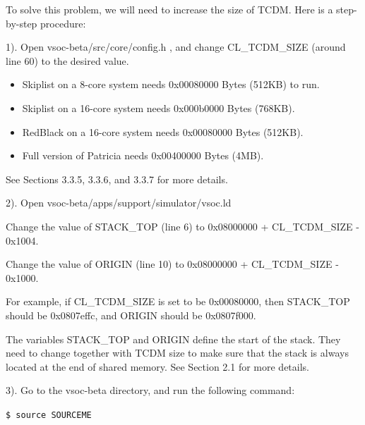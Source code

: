 \documentclass{article}
\begin{document}
To solve this problem, we will need to increase the size of TCDM. Here is a step-by-step procedure:

\vspace{2mm}

1). Open vsoc-beta/src/core/config.h , and change CL\_TCDM\_SIZE (around line 60) to the desired value.

{
\addtolength{\leftskip}{6mm}

\vspace{-2mm}

\begin{itemize}
\item Skiplist on a 8-core system needs 0x00080000 Bytes (512KB) to run.
\item Skiplist on a 16-core system needs 0x000b0000 Bytes (768KB).
\item RedBlack on a 16-core system needs 0x00080000 Bytes (512KB).
\item Full version of Patricia needs 0x00400000 Bytes (4MB).
\end{itemize}

\vspace{-2mm}
See Sections 3.3.5, 3.3.6, and 3.3.7 for more details.

}

\vspace{2mm}
2). Open vsoc-beta/apps/support/simulator/vsoc.ld 

{
\addtolength{\leftskip}{6mm}

Change the value of STACK\_TOP (line 6) to 0x08000000 + CL\_TCDM\_SIZE - 0x1004.

Change the value of ORIGIN (line 10) to 0x08000000 + CL\_TCDM\_SIZE - 0x1000.

For example, if CL\_TCDM\_SIZE is set to be 0x00080000, then STACK\_TOP should be 0x0807effc, and ORIGIN should be 0x0807f000.

The variables STACK\_TOP and ORIGIN define the start of the stack. They need to change together with TCDM size to make sure that the stack is always located at the end of shared memory. See Section 2.1 for more details.

}

\vspace{2mm}
3). Go to the vsoc-beta directory, and run the following command:

{
\addtolength{\leftskip}{6mm}

\hspace{5mm}\texttt{\$ source SOURCEME}

}
\end{document}
